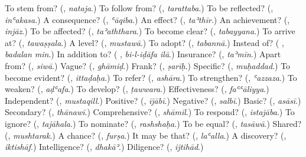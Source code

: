 \begin{tcolorbox}[breakable,colback=teal!4,colframe=teal!35!black,title={Before you move on}]
To stem from? (\textbf{}, \emph{nataja}.) To follow from? (\textbf{}, \emph{tarattaba}.) To be reflected? (\textbf{}, \emph{inʿakasa}.) A consequence? (\textbf{}, \emph{ʿāqiba}.) An effect? (\textbf{}, \emph{taʾthīr}.) An achievement? (\textbf{}, \emph{injāz}.) To be affected? (\textbf{}, \emph{taʾaththara}.) To become clear? (\textbf{}, \emph{tabayyana}.) To arrive at? (\textbf{}, \emph{tawaṣṣala}.) A level? (\textbf{}, \emph{mustawā}.) To adopt? (\textbf{}, \emph{tabannā}.) Instead of? (\textbf{ }, \emph{badalan min}.) In addition to? (\textbf{ }, \emph{bi-l-iḍāfa ilā}.) Insurance? (\textbf{}, \emph{taʾmīn}.) Apart from? (\textbf{}, \emph{siwā}.) Vague? (\textbf{}, \emph{ghāmiḍ}.) Frank? (\textbf{}, \emph{ṣarīḥ}.) Specific? (\textbf{}, \emph{muḥaddad}.) To become evident? (\textbf{}, \emph{ittaḍaḥa}.) To refer? (\textbf{}, \emph{ashāra}.) To strengthen? (\textbf{}, \emph{ʿazzaza}.) To weaken? (\textbf{}, \emph{aḍʿafa}.) To develop? (\textbf{}, \emph{ṭawwara}.) Effectiveness? (\textbf{}, \emph{faʿʿāliyya}.) Independent? (\textbf{}, \emph{mustaqill}.) Positive? (\textbf{}, \emph{ījābī}.) Negative? (\textbf{}, \emph{salbī}.) Basic? (\textbf{}, \emph{asāsī}.) Secondary? (\textbf{}, \emph{thānawī}.) Comprehensive? (\textbf{}, \emph{shāmil}.) To respond? (\textbf{}, \emph{istajāba}.) To ignore? (\textbf{}, \emph{tajāhala}.) To nominate? (\textbf{}, \emph{rashshaḥa}.) To be equal? (\textbf{}, \emph{tasāwā}.) Shared? (\textbf{}, \emph{mushtarak}.) A chance? (\textbf{}, \emph{furṣa}.) It may be that? (\textbf{}, \emph{laʿalla}.) A discovery? (\textbf{}, \emph{iktishāf}.) Intelligence? (\textbf{}, \emph{dhakāʾ}.) Diligence? (\textbf{}, \emph{ijtihād}.)
\end{tcolorbox}
